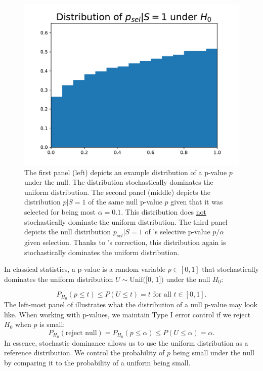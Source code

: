 \documentclass{article}
\begin{document}
\begin{figure}[]
{\begin{minipage}{0.33\textwidth}
    \end{minipage}\hfill
    \hspace{0.02\textwidth}
    \begin{minipage}{0.33\textwidth}
        \centering
        \includegraphics[width=\textwidth]{p_sel_dist_given.pdf}
    \end{minipage}
    }
    \caption{The first panel (left) depicts an example distribution of a p-value $p$ under the null. The distribution stochastically dominates the uniform distribution. The second panel (middle) depicts the distribution $p | S = 1$ of the same null p-value $p$ given that it was selected for being most $\alpha=0.1$. This distribution does \underline{not} stochastically dominate the uniform distribution. The third panel depicts the null distribution $p_{sel}|S=1$ of 's selective p-value $p/\alpha$ given selection. Thanks to 's correction, this distribution again is stochastically dominates  the uniform distribution.}
    \label{fig:distributions}
\end{figure}

In classical statistics, a p-value is a random variable $p \in [0, 1]$ that stochastically dominates the uniform distribution $U \sim \text{Unif([0, 1])}$ under the null $H_0$:

\begin{equation*}
    P_{H_0}(p \leq t) \leq P(U \leq t)= t \text{ for all } t \in [0, 1].
\end{equation*}
The left-most panel of  illustrates what the distribution of a null p-value may look like. When working with p-values, we maintain Type I error control if we reject $H_0$ when $p$ is small:
\begin{equation*}
    P_{H_0}(\text{reject null}) = P_{H_0}(p \leq \alpha) \leq P(U \leq \alpha)  = \alpha.
\end{equation*}
In essence, stochastic dominance allows us to use the uniform distribution as a reference distribution. We control the probability of $p$ being small under the null by comparing it to the probability of a uniform being small. 
\end{document}
